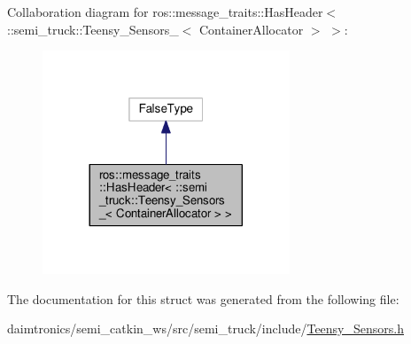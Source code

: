 Collaboration diagram for ros\+:\+:message\+\_\+traits\+:\+:Has\+Header$<$ \+:\+:semi\+\_\+truck\+:\+:Teensy\+\_\+\+Sensors\+\_\+$<$ Container\+Allocator $>$ $>$\+:\nopagebreak
\begin{figure}[H]
\begin{center}
\leavevmode
\includegraphics[width=209pt]{structros_1_1message__traits_1_1_has_header_3_01_1_1semi__truck_1_1_teensy___sensors___3_01_cont99a4e8a172ebdec2ee5e1c6f01ac464b}
\end{center}
\end{figure}


The documentation for this struct was generated from the following file\+:\begin{DoxyCompactItemize}
\item 
daimtronics/semi\+\_\+catkin\+\_\+ws/src/semi\+\_\+truck/include/\hyperlink{_teensy___sensors_8h}{Teensy\+\_\+\+Sensors.\+h}\end{DoxyCompactItemize}
